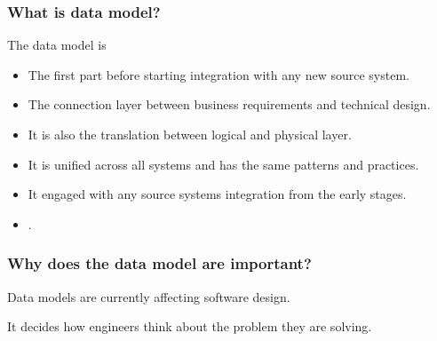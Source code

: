 
\begin{frame}
    \frametitle{What is data model?}
    The data model is
    \begin{itemize}[<+->]
        \item The first part before starting integration with any new source system.
        \item The connection layer between business requirements and technical design.
        \item It is also the translation between logical and physical layer.
        \item It is unified across all systems and has the same patterns and practices.
        \item It engaged with any source systems integration from the early stages.
        \item {}.
    \end{itemize}
\end{frame}


\begin{frame}
    \frametitle{Why does the data model are important?}
    \begin{wideitemize}
        \item Data models are currently affecting software design.
        \item It decides how engineers think about the problem they are solving.
    \end{wideitemize}
\end{frame}

